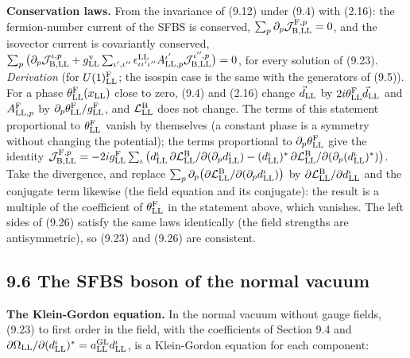 \documentclass[
  10pt,
]{article}
\begin{document}
\textbf{Conservation laws.} From the invariance of (9.12) under (9.4)
with (2.16): the fermion-number current of the SFBS is conserved,
\(\sum_p\partial_p\mathcal J^{{\rm F},p}_{{\rm B},{\rm LL}}=0\), and the
isovector current is covariantly conserved,
\(\sum_p\big(\partial_p\mathcal J^{\iota,p}_{{\rm B},{\rm LL}}+g^{\rm v}_{\rm LL}\sum_{\iota',\iota''}\epsilon^{\rm LL}_{\iota\iota'\iota''}A^{\iota'}_{{\rm LL},p}\mathcal J^{\iota'',p}_{{\rm B},{\rm LL}}\big)=0\),
for every solution of (9.23). \emph{Derivation} (for
\(U(1)^{\rm F}_{\rm LL}\); the isospin case is the same with the
generators of (9.5)). For a phase
\(\theta^{\rm F}_{\rm LL}(x_{\rm LL})\) close to zero, (9.4) and (2.16)
change \(\vec d_{\rm LL}\) by
\(2i\theta^{\rm F}_{\rm LL}\vec d_{\rm LL}\) and
\(A^{\rm F}_{{\rm LL},p}\) by
\(\partial_p\theta^{\rm F}_{\rm LL}/g^{\rm F}_{\rm LL}\), and
\(\mathcal L^{\rm B}_{\rm LL}\) does not change. The terms of this
statement proportional to \(\theta^{\rm F}_{\rm LL}\) vanish by
themselves (a constant phase is a symmetry without changing the
potential); the terms proportional to
\(\partial_p\theta^{\rm F}_{\rm LL}\) give the identity
\(\mathcal J^{{\rm F},p}_{{\rm B},{\rm LL}}=-2ig^{\rm F}_{\rm LL}\sum_\iota\big(d^\iota_{\rm LL}\,\partial\mathcal L^{\rm B}_{\rm LL}/\partial(\partial_pd^\iota_{\rm LL})-(d^\iota_{\rm LL})^*\,\partial\mathcal L^{\rm B}_{\rm LL}/\partial(\partial_p(d^\iota_{\rm LL})^*)\big)\).
Take the divergence, and replace
\(\sum_p\partial_p\big(\partial\mathcal L^{\rm B}_{\rm LL}/\partial(\partial_pd^\iota_{\rm LL})\big)\)
by \(\partial\mathcal L^{\rm B}_{\rm LL}/\partial d^\iota_{\rm LL}\) and
the conjugate term likewise (the field equation and its conjugate): the
result is a multiple of the coefficient of \(\theta^{\rm F}_{\rm LL}\)
in the statement above, which vanishes. The left sides of (9.26) satisfy
the same laws identically (the field strengths are antisymmetric), so
(9.23) and (9.26) are consistent.

\hypertarget{the-sfbs-boson-of-the-normal-vacuum}{%
\subsection{9.6 The SFBS boson of the normal
vacuum}\label{the-sfbs-boson-of-the-normal-vacuum}}

\textbf{The Klein-Gordon equation.} In the normal vacuum without gauge
fields, (9.23) to first order in the field, with the coefficients of
Section 9.4 and
\(\partial\Omega_{\rm LL}/\partial(d^\iota_{\rm LL})^*=a^{\rm GL}_{\rm LL}d^\iota_{\rm LL}\),
is a Klein-Gordon equation for each component:
\end{document}
